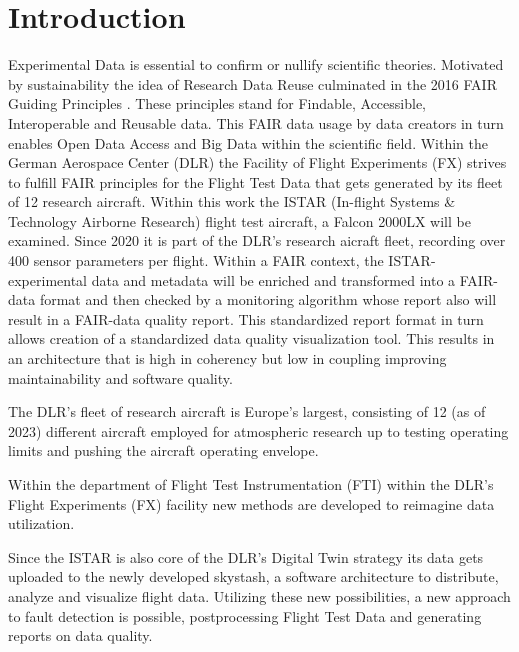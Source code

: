 \chapter{Introduction \label{ch1-intro}}
Experimental Data is essential to confirm or nullify scientific theories. Motivated by sustainability the idea of Research Data Reuse culminated in the 2016 FAIR Guiding Principles \cite{wilkinson_fair_2016}. These principles stand for Findable, Accessible, Interoperable and Reusable data. This FAIR data usage by data creators in turn enables Open Data Access and Big Data within the scientific field. \cite{hodson_fair_2018} Within the German Aerospace Center (DLR) the Facility of Flight Experiments (FX) strives to fulfill FAIR principles for the Flight Test Data that gets generated by its fleet of 12 research aircraft. Within this work the ISTAR (In-flight Systems \& Technology Airborne Research) flight test aircraft, a Falcon 2000LX will be examined.
Since 2020 it is part of the DLR's research aicraft fleet, recording over 400 sensor parameters per flight. Within a FAIR context, the ISTAR-experimental data and metadata will be enriched and transformed into a FAIR-data format and then checked by a monitoring algorithm whose report also will result in a FAIR-data quality report. This standardized report format in turn allows creation of a standardized data quality visualization tool. This results in an architecture that is high in coherency but low in coupling improving maintainability and software quality.




The DLR's fleet of research aircraft is Europe's largest, consisting of 12 (as of 2023) different aircraft employed for atmospheric research up to testing operating limits and pushing the  aircraft operating envelope.

Within the department of Flight Test Instrumentation (FTI) within the DLR's Flight Experiments (FX) facility new methods are developed to reimagine data utilization.

Since the ISTAR is also core of the DLR's Digital Twin strategy its data gets uploaded to the newly developed skystash, a software architecture to distribute, analyze and visualize flight data. Utilizing these new possibilities, a new approach to fault detection is possible, postprocessing Flight Test Data and generating reports on data quality.

